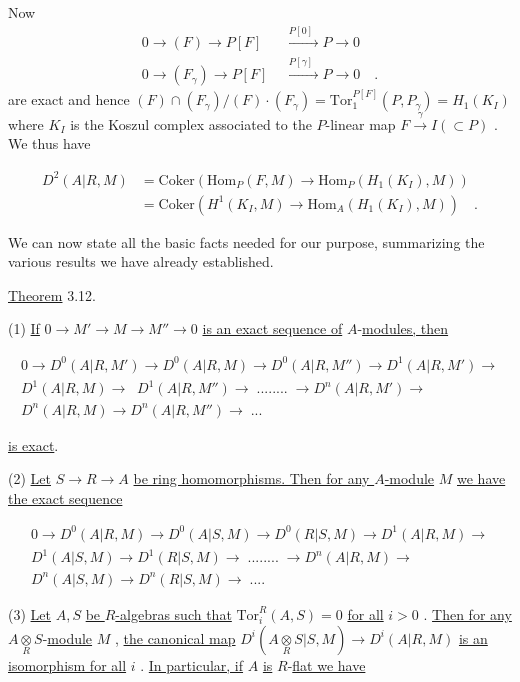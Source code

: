 Now
$$\begin{aligned}
0 \to (F) \to P[F] &\xrightarrow{\;\;P[0]\;\;} P \to 0\\
0 \to (F_\gamma) \to P[F] &\xrightarrow{\;\;P[\gamma]\;\;} P \to 0 \quad .
\end{aligned}$$
are exact and hence  $(F) \cap (F_\gamma)/(F)\cdot(F_\gamma) = \mathrm{Tor}_1^{P[F]}(P, P_\gamma) = H_1(K_I)$  where  $K_I$  is the Koszul complex associated  to the $P$-linear map  $F \xrightarrow{\gamma} I(\subset P)$  . We thus have

\begin{align*}
D^2(A|R, M) &= \mathrm{Coker}(\mathrm{Hom}_P(F, M) \to \mathrm{Hom}_P(H_1(K_I), M))\\
&= \mathrm{Coker}(H^1(K_I, M) \to \mathrm{Hom}_A(H_1(K_I), M))\quad .
\end{align*}

We can now state all the basic facts needed for our purpose, summarizing the various results we have already established.




\underline{Theorem} 3.12.

(1)  \underline{If}  $0 \to M' \to M \to M'' \to 0$  \underline{is an exact sequence of} $A$-\underline{modules, then}

\begin{gather*}
0 \to D^0(A|R, M') \to D^0(A|R, M) \to D^0(A|R, M'') \to D^1(A|R, M') \to\\
D^1(A|R, M)\to\;\; D^1(A|R, M'') \to\; ........ \;\to D^n(A|R, M') \to\\
D^n(A|R, M) \to D^n(A|R, M'') \to \;...
\end{gather*}

\underline{is exact}.

(2)  \underline{Let}  $S \to R \to A$  \underline{be ring homomorphisms. Then for any $A$-module}  $M$  \underline{we have the exact sequence}

\begin{gather*}
0 \to D^0(A|R, M) \to D^0(A|S, M) \to D^0(R|S, M) \to D^1(A|R, M) \to\\
D^1(A|S, M) \to D^1(R|S, M) \to\; ........ \;\to D^n(A|R, M) \to\\
D^n(A|S, M) \to D^n(R|S, M) \to \;....
\end{gather*}

(3)  \underline{Let}  $A, S$  \underline{be $R$-algebras such that}  $\mathrm{Tor}_i^R(A, S) = 0$  \underline{for all}  $i > 0$  . \underline{Then for any}  $A\underset{R}{\otimes}S$-\underline{module}  $M$  , \underline{the canonical map}  $D^i(A\underset{R}{\otimes}S|S, M) \to D^i(A|R, M)$  \underline{is an} \underline{isomorphism for all}  $i$  . \underline{In particular, if}  $A$  \underline{is} $R$-\underline{flat we have}


